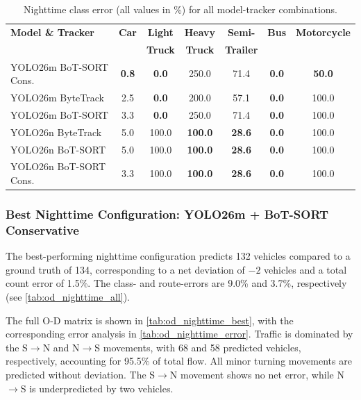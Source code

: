 \begin{table}[H]
\caption{Nighttime class error (all values in \%) for all model-tracker combinations.}
\centering
\small
\begin{tabular}{l c c c c c c}
\toprule
\textbf{Model \& Tracker} & \textbf{Car} & \textbf{Light} & \textbf{Heavy} & \textbf{Semi-} & \textbf{Bus} & \textbf{Motorcycle} \\
 & & \textbf{Truck} & \textbf{Truck} & \textbf{Trailer} & & \\
\midrule
YOLO26m BoT-SORT Cons. & \textbf{0.8} & \textbf{0.0} & 250.0 & 71.4 & \textbf{0.0} & \textbf{50.0} \\
YOLO26m ByteTrack       & 2.5 & \textbf{0.0} & 200.0 & 57.1 & \textbf{0.0} & 100.0 \\
YOLO26m BoT-SORT        & 3.3 & \textbf{0.0} & 250.0 & 71.4 & \textbf{0.0} & 100.0 \\
YOLO26n ByteTrack       & 5.0 & 100.0 & \textbf{100.0} & \textbf{28.6} & \textbf{0.0} & 100.0 \\
YOLO26n BoT-SORT        & 5.0 & 100.0 & \textbf{100.0} & \textbf{28.6} & \textbf{0.0} & 100.0 \\
YOLO26n BoT-SORT Cons.  & 3.3 & 100.0 & \textbf{100.0} & \textbf{28.6} & \textbf{0.0} & 100.0 \\
\bottomrule
\end{tabular}
\label{tab:nighttime_class_errors}
\end{table}

\subsubsection{Best Nighttime Configuration: YOLO26m + BoT-SORT Conservative}

The best-performing nighttime configuration predicts 132 vehicles compared to a ground truth of 134, corresponding to a net deviation of $-2$ vehicles and a total count error of 1.5\%. The class- and route-errors are 9.0\% and 3.7\%, respectively (see \autoref{tab:od_nighttime_all}).

The full O-D matrix is shown in \autoref{tab:od_nighttime_best}, with the corresponding error analysis in \autoref{tab:od_nighttime_error}. Traffic is dominated by the S$\to$N and N$\to$S movements, with 68 and 58 predicted vehicles, respectively, accounting for 95.5\% of total flow. All minor turning movements are predicted without deviation. The S$\to$N movement shows no net error, while N$\to$S is underpredicted by two vehicles.


